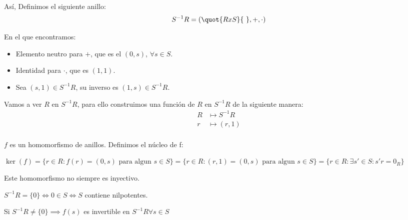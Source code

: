 Así, Definimos el siguiente anillo:
 $$S^{-1}R = \left( \quot{RxS}{~},+,\cdot \right)$$

En el que encontramos:
\begin{itemize}
	\item Elemento neutro para $+$, que es el $(0,s)$, $\forall s \in S$.
	\item Identidad para $\cdot$, que es $(1,1)$.
	\item Sea $(s,1) \in S^{-1}R$, su inverso es $(1,s) \in S^{-1}R$.
\end{itemize}

Vamos a ver $R$ en $S^{-1}R$, para ello construimos una función de $R$ en $S^{-1}R$ de la siguiente manera: 
\begin{align*}
	R & \longmapsto  S^{-1}R\\
	r & \longmapsto (r,1) \\
\end{align*}

$f$ es un homomorfismo de anillos. Definimos el núcleo de f:

$\ker(f)=\{ r\in R: f(r)=(0,s) \text{ para algun }s\in S \}  = \{ r \in R: (r,1) = (0,s) \text{ para algun }s\in S \} = \{ r \in R: \exists s' \in S: s'r=0_R \}$

Este homomorfismo no siempre es inyectivo.

\begin{prop}
	$S^{-1}R=\{ 0 \} \Leftrightarrow 0 \in S \Leftrightarrow S$ contiene nilpotentes.
\end{prop}

\begin{prop}
	Si $S^{-1}R \neq \{ 0 \} \implies f(s)$ es invertible en $S^{-1}R \forall s \in S$
\end{prop}

